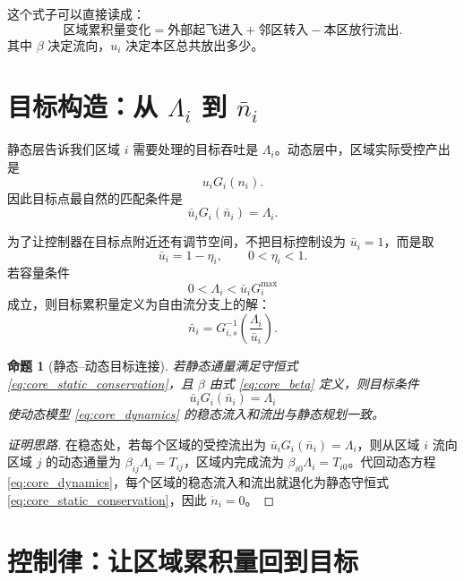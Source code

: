 \documentclass[a4paper,12pt]{article}
\theoremstyle{plain}
\newtheorem{proposition}{命题}[section]
\theoremstyle{definition}
\theoremstyle{remark}
\begin{document}
这个式子可以直接读成：
\[
\text{区域累积量变化}
=
\text{外部起飞进入}
+
\text{邻区转入}
-
\text{本区放行流出}.
\]
其中 $\beta$ 决定流向，$u_i$ 决定本区总共放出多少。

\section{目标构造：从 \texorpdfstring{$\Lambda_i$}{Lambda} 到 \texorpdfstring{$\bar n_i$}{nbar}}

静态层告诉我们区域 $i$ 需要处理的目标吞吐是 $\Lambda_i$。动态层中，区域实际受控产出是
\[
    u_iG_i(n_i).
\]
因此目标点最自然的匹配条件是
\begin{equation}\label{eq:core_bridge}
    \bar u_iG_i(\bar n_i)=\Lambda_i .
\end{equation}

为了让控制器在目标点附近还有调节空间，不把目标控制设为 $\bar u_i=1$，而是取
\begin{equation}\label{eq:core_ubar}
    \bar u_i=1-\eta_i,\qquad 0<\eta_i<1.
\end{equation}
若容量条件
\begin{equation}\label{eq:core_capacity}
    0<\Lambda_i<\bar u_iG_i^{\max}
\end{equation}
成立，则目标累积量定义为自由流分支上的解：
\begin{equation}\label{eq:core_target}
    \bar n_i
    =
    G_{i,s}^{-1}\left(\frac{\Lambda_i}{\bar u_i}\right).
\end{equation}

\begin{proposition}[静态--动态目标连接]\label{prop:core_bridge}
若静态通量满足守恒式 \eqref{eq:core_static_conservation}，且 $\beta$ 由式 \eqref{eq:core_beta} 定义，则目标条件
\[
    \bar u_iG_i(\bar n_i)=\Lambda_i
\]
使动态模型 \eqref{eq:core_dynamics} 的稳态流入和流出与静态规划一致。
\end{proposition}

\begin{proof}[证明思路]
在稳态处，若每个区域的受控流出为 $\bar u_iG_i(\bar n_i)=\Lambda_i$，则从区域 $i$ 流向区域 $j$ 的动态通量为 $\beta_{ij}\Lambda_i=T_{ij}$，区域内完成流为 $\beta_{i0}\Lambda_i=T_{i0}$。代回动态方程 \eqref{eq:core_dynamics}，每个区域的稳态流入和流出就退化为静态守恒式 \eqref{eq:core_static_conservation}，因此 $\dot n_i=0$。
\end{proof}

\section{控制律：让区域累积量回到目标}
\end{document}
